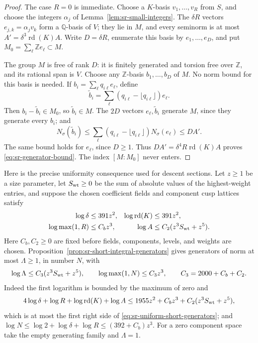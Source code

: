 \begin{proof}
The case \(R=0\) is immediate.  Choose a \(K\)-basis
\(v_1,\ldots,v_R\) from \(S\), and choose the integers \(\alpha_j\)
of Lemma~\ref{lem:sr-small-integers}.
The \(\delta R\) vectors \(e_{j,k}=\alpha_jv_k\) form a
\(\mathbb Q\)-basis of \(V\); they lie in \(M\), and every seminorm
is at most
\(A'=\delta^3\operatorname{rd}(K)A\).
Write \(D=\delta R\), enumerate this basis by \(e_1,\ldots,e_D\),
and put \(M_0=\sum_\ell\mathbb Ze_\ell\subset M\).

The group \(M\) is free of rank \(D\): it is finitely generated and
torsion free over \(\mathbb Z\), and its rational span is \(V\).
Choose any \(\mathbb Z\)-basis \(b_1,\ldots,b_D\) of \(M\).
No norm bound for this basis is needed.
If \(b_i=\sum_\ell q_{i\ell}e_\ell\), define
\[
 \widetilde b_i=\sum_\ell
       (q_{i\ell}-\lfloor q_{i\ell}\rfloor)e_\ell.
\]
Then \(b_i-\widetilde b_i\in M_0\), so \(\widetilde b_i\in M\).
The \(2D\) vectors \(e_\ell,\widetilde b_i\) generate \(M\), since
they generate every \(b_i\); and
\[
 N_\sigma(\widetilde b_i)
 \le\sum_\ell
       (q_{i\ell}-\lfloor q_{i\ell}\rfloor)N_\sigma(e_\ell)
 \le DA'.
\]
The same bound holds for \(e_\ell\), since \(D\ge1\).
Thus \(DA'=\delta^4R\operatorname{rd}(K)A\) proves
\eqref{eq:sr-generator-bound}.  The index \([M:M_0]\) never enters.
\end{proof}

Here is the precise uniformity consequence used for descent sections.
Let \(z\ge1\) be a size parameter, let \(S_{\rm wt}\ge0\) be the sum
of absolute values of the highest-weight entries, and suppose the
chosen coefficient fields and component cusp lattices satisfy
\begin{align}
 \log\delta&\le391z^2,&
 \log\operatorname{rd}(K)&\le391z^2,\label{eq:sr-field-metric-size}\\
 \log\max(1,R)&\le C_bz^3,&
 \log A&\le C_2(z^3S_{\rm wt}+z^5).\label{eq:sr-span-metric-size}
\end{align}
Here \(C_b,C_2\ge0\) are fixed before fields, components, levels, and
weights are chosen.  Proposition~\ref{prop:sr-short-integral-generators}
gives generators of norm at most \(\Lambda\ge1\), in number \(N\), with
\begin{equation}\label{eq:sr-uniform-short-generators}
 \log\Lambda\le C_3(z^3S_{\rm wt}+z^5),\qquad
 \log\max(1,N)\le C_3z^3,\qquad
 C_3=2000+C_b+C_2.
\end{equation}
Indeed the first logarithm is bounded by the maximum of zero and
\[
 4\log\delta+\log R+\log\operatorname{rd}(K)+\log A
 \le1955z^2+C_bz^3+C_2(z^3S_{\rm wt}+z^5),
\]
which is at most the first right side of
\eqref{eq:sr-uniform-short-generators}; and
\(\log N\le\log2+\log\delta+\log R\le(392+C_b)z^3\).
For a zero component space take the empty generating family and
\(\Lambda=1\).

